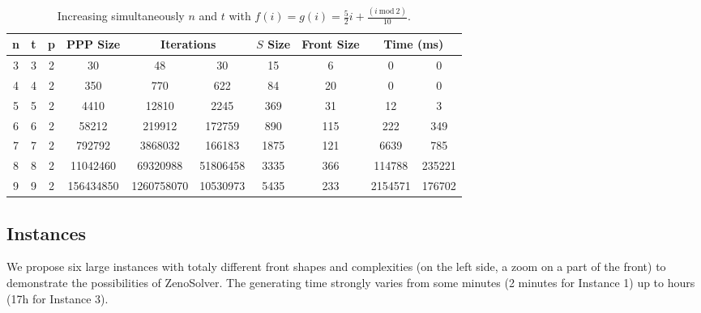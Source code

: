 \documentclass{llncs}
\def\ZENOSOLVER{{\sc ZenoSolver}}
\begin{document}
\begin {table}[H]
\centering
\caption{\label{table:f5} Increasing simultaneously $n$ and $t$ with $f(i)=g(i)=\frac{5}{2}i + \frac{(i ~\text{mod}~ 2)}{10}$.}
\begin{tabular}{|c|c|c|c|c|c|c|c|c|c|}
  \hline
  n & t & p & PPP Size & \multicolumn{2}{c|}{Iterations} & $S$ Size & Front Size & \multicolumn{2}{c|}{Time (ms)} \\
  \hline
    3 & 3 & 2 & 30 & 48 & 30 & 15 & 6 & 0 & 0\\
    4 & 4 & 2 & 350 & 770 & 622 & 84 & 20 & 0 & 0\\
    5 & 5 & 2 & 4410 & 12810 & 2245 & 369 & 31 & 12 & 3\\
    6 & 6 & 2 & 58212 & 219912 & 172759 & 890 & 115 & 222 & 349\\
    7 & 7 & 2 & 792792 & 3868032 & 166183 & 1875 & 121 & 6639 & 785\\
    8 & 8 & 2 & 11042460 & 69320988 & 51806458 & 3335 & 366 & 114788 & 235221\\
    9 & 9 & 2 & 156434850 & 1260758070 & 10530973 & 5435 & 233 & 2154571 & 176702\\
  \hline
\end{tabular}
\end{table}

\subsection{Instances}
We propose six large instances with totaly different front shapes and complexities (on the left side, a zoom on a part of the front) to demonstrate the possibilities of \ZENOSOLVER. The generating time strongly varies from some minutes (2 minutes for Instance 1) up to hours (17h for Instance 3). 
\end{document}
